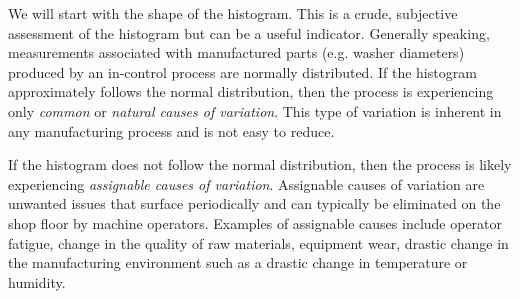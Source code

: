 \documentclass{ximera}
\begin{document}
We will start with the shape of the histogram.  This is a crude, subjective assessment of the histogram but can be a useful indicator.  Generally speaking, measurements associated with manufactured parts (e.g. washer diameters) produced by an in-control process are normally distributed.  If the histogram approximately follows the normal distribution, then the process is experiencing only \emph{common} or \emph{natural causes of variation}. This type of variation is inherent in any manufacturing process and is not easy to reduce.  

If the histogram does not follow the normal distribution, then the process is likely experiencing \emph{assignable causes of variation}.  Assignable causes of variation are unwanted issues that surface periodically and can typically be eliminated on the shop floor by machine operators.  Examples of assignable causes include operator fatigue, change in the quality of raw materials, equipment wear, drastic change in the manufacturing environment such as a drastic change in temperature or humidity.
\end{document}
